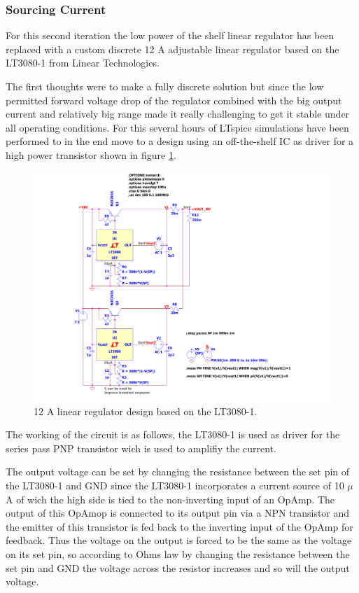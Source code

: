 \subsubsection{Sourcing Current}
For this second iteration the low power of the shelf linear regulator has been replaced with a custom discrete 12 A adjustable linear regulator based on the LT3080-1 from Linear Technologies.

The first thoughts were to make a fully discrete solution but since the low permitted forward voltage drop of the regulator combined with the big output current and relatively big range made it really challenging to get it stable 
under all operating conditions. For this several hours of LTspice simulations have been performed to in the end move to a design using an off-the-shelf IC as driver for a high power transistor shown in figure \ref{fig:LT3080-1_LinRegSchematic}.

\begin{figure}[h!]
    \centering
    \includegraphics[scale=0.3]{LT3080-1_LinRegSchematic.pdf}
    \caption{12 A linear regulator design based on the LT3080-1.}
    \label{fig:LT3080-1_LinRegSchematic}
\end{figure}

The working of the circuit is as follows, the LT3080-1 is used as driver for the series pass PNP transistor wich is used to amplifiy the current.

The output voltage can be set by changing the resistance between the set pin of the LT3080-1 and GND since the LT3080-1 incorporates a current source of 10 $\mu$A of wich the high side is tied to the non-inverting input of an OpAmp. The output of this OpAmop is connected to its output pin via a NPN transistor and the emitter of this transistor is fed back to the inverting input of the OpAmp for feedback. Thus the voltage on the output is forced to be the same as the voltage on its set pin, so according to Ohms law by changing the resistance between the set pin and GND the voltage across the resistor increases and so will the output voltage.

